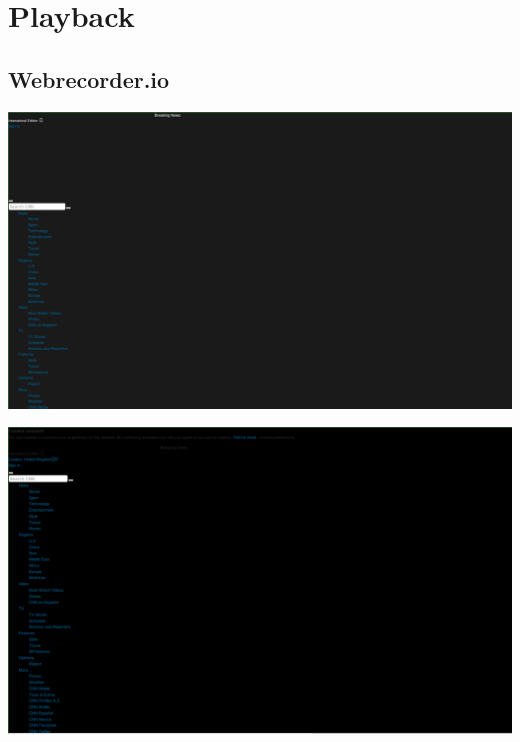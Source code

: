 \section{Playback}
\subsection{Webrecorder.io}
\begin{minipage}{\linewidth}
	\includegraphics[scale=0.55]{figures/playback/webrecorder_7_wail.PNG}
	\label{webrecorder_7_wail}
\end{minipage}
\newpage
\begin{minipage}{\linewidth}
	\includegraphics[scale=0.55]{figures/playback/webrecorder_7_warcreate.PNG}
	\label{webrecorder_7_warcreate}
\end{minipage}
\newpage
